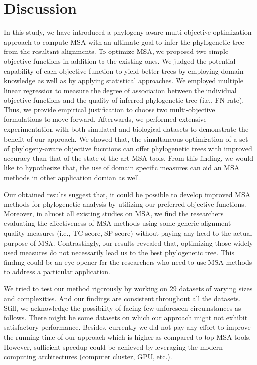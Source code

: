 \section{Discussion}
\label{sec:discussion}
In this study, we have introduced a phylogeny-aware multi-objective optimization approach to compute MSA with an ultimate goal to infer the phylogenetic tree from the resultant alignments. To optimize MSA, we proposed two simple objective functions in addition to the existing ones. We judged the potential capability of each objective function to yield better trees by employing domain knowledge as well as by applying statistical approaches. We employed multiple linear regression to measure the degree of association between the individual objective functions and the quality of inferred phylogenetic tree (i.e., FN rate). Thus, we provide empirical justification to choose two multi-objective formulations to move forward. Afterwards, we performed extensive experimentation with both simulated and biological datasets to demonstrate the benefit of our approach. We showed that, the simultaneous optimization of a set of phylogeny-aware objective fucntions can offer phylogenetic trees with improved accuracy than that of the state-of-the-art MSA tools. From this finding, we would like to hypothesize that, the use of domain specific measures can aid an MSA methods in other application domian as well.

Our obtained results suggest that, it could be possible to develop improved MSA methods for phylogenetic analysis by utilizing our preferred objective functions. Moreover, in almost all existing studies on MSA, we find the researchers evaluating the effectiveness of MSA methods using some generic alignment quality measures (i.e., TC score, SP score) without paying any heed to the actual purpose of MSA. Contrastingly, our results revealed that, optimizing those widely used measures do not necessarily lead us to the best phylogenetic tree. This finding could be an eye opener for the researchers who need to use MSA methods to address a particular application. 

We tried to test our method rigorously by working on 29 datasets of varying sizes and complexities. And our findings are consistent throughout all the datasets. Still, we acknowledge the possibility of facing few unforeseen circumstances as follows. There might be some datasets on which our approach might not exhibit satisfactory performance. Besides, currently we did not pay any effort to improve the running time of our approach which is higher as compared to top MSA tools. However, sufficient speedup could be achieved by leveraging the modern computing architectures (computer cluster, GPU, etc.).





